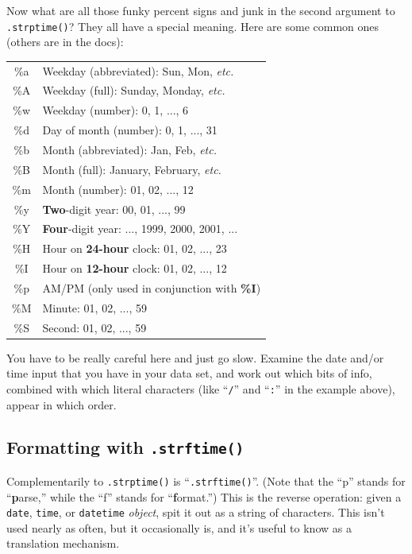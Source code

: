 Now what are all those funky percent signs and junk in the second argument to
\texttt{.strptime()}? They all have a special meaning. Here are some common
ones (others are in the docs):

\begin{center}
\begin{tabular}{|c|l|}
\hline
\%a & Weekday (abbreviated): Sun, Mon, \textit{etc.} \\
\%A & Weekday (full): Sunday, Monday, \textit{etc.} \\
\%w & Weekday (number): 0, 1, ..., 6 \\
\%d & Day of month (number): 0, 1, ..., 31 \\
\%b & Month (abbreviated): Jan, Feb, \textit{etc.} \\
\%B & Month (full): January, February, \textit{etc.} \\
\%m & Month (number): 01, 02, ..., 12 \\
\%y & \textbf{Two}-digit year: 00, 01, ..., 99 \\
\%Y & \textbf{Four}-digit year: ..., 1999, 2000, 2001, ...\\
\hline
\%H & Hour on \textbf{24-hour} clock: 01, 02, ..., 23 \\
\%I & Hour on \textbf{12-hour} clock: 01, 02, ..., 12 \\
\%p & AM/PM (only used in conjunction with \textbf{\%I}) \\
\%M & Minute: 01, 02, ..., 59 \\
\%S & Second: 01, 02, ..., 59 \\
\hline
\end{tabular}
\end{center}

\pagebreak
You have to be really careful here and just go slow. Examine the date and/or
time input that you have in your data set, and work out which bits of info,
combined with which literal characters (like ``\texttt{/}'' and ``\texttt{:}''
in the example above), appear in which order.

\subsection{Formatting with \texttt{.strftime()}}

Complementarily to \texttt{.strptime()} is ``\texttt{.strftime()}''. (Note that
the ``p'' stands for ``\textbf{p}arse,'' while
the ``f'' stands for ``\textbf{f}ormat.'') This is the reverse operation: given
a \texttt{date}, \texttt{time}, or \texttt{datetime} \textit{object}, spit it
out as a string of characters. This isn't used nearly as often, but it
occasionally is, and it's useful to know as a translation mechanism.

